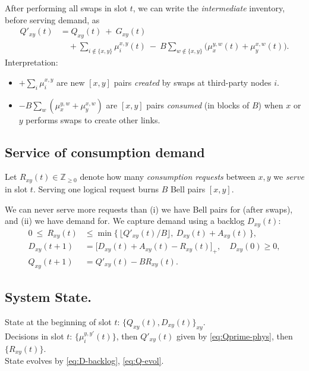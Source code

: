 \documentclass[11pt]{article}
\begin{document}
After performing all swaps in slot $t$, we can write the \emph{intermediate} inventory,
before serving demand, as
\begin{equation}
\begin{aligned}
Q'_{xy}(t)
&= Q_{xy}(t)\ +\ G_{xy}(t) \\
&\quad + \sum_{i\notin\{x,y\}}\mu_i^{x,y}(t)
\ -\ B\sum_{w\notin\{x,y\}}
\big(\mu_x^{y,w}(t)+\mu_y^{x,w}(t)\big) .
\end{aligned}
\label{eq:Qprime-phys}
\end{equation}
Interpretation:
\begin{itemize}[leftmargin=2em]
\item $+\sum_i \mu_i^{x,y}$ are new $[x,y]$ pairs \emph{created} by swaps at third-party nodes $i$.
\item $-B\sum_w(\mu_x^{y,w}+\mu_y^{x,w})$ are $[x,y]$ pairs \emph{consumed} (in blocks of $B$) when $x$ or $y$ performs swaps to create other links.
\end{itemize}

\subsection{Service of consumption demand}

Let $R_{xy}(t)\in\mathbb{Z}_{\ge 0}$ denote how many \emph{consumption requests} between $x,y$ we \emph{serve} in slot $t$. Serving one logical request burns $B$ Bell pairs $[x,y]$.

We can never serve more requests than (i) we have Bell pairs for (after swaps), and (ii) we have demand for. We capture demand using a backlog $D_{xy}(t)$:
\begin{align}
0\ \le\ R_{xy}(t)
&\le \min\Big\{\,\big\lfloor Q'_{xy}(t)/B\big\rfloor,\ D_{xy}(t)+A_{xy}(t)\,\Big\},
\label{eq:R-box}\\
D_{xy}(t{+}1)
&=\big[D_{xy}(t)+A_{xy}(t)-R_{xy}(t)\big]_+ , \quad D_{xy}(0)\ge 0,
\label{eq:D-backlog}\\
Q_{xy}(t{+}1)
&= Q'_{xy}(t) - B R_{xy}(t).
\label{eq:Q-evol}
\end{align}

\subsection{System State.}
State at the beginning of slot $t$: $\{Q_{xy}(t), D_{xy}(t)\}_{xy}$. \\
Decisions in slot $t$: $\{\mu_i^{y,y'}(t)\}$, then $Q'_{xy}(t)$ given by \eqref{eq:Qprime-phys}, then $\{R_{xy}(t)\}$.\\
State evolves by \eqref{eq:D-backlog}, \eqref{eq:Q-evol}.
\end{document}
